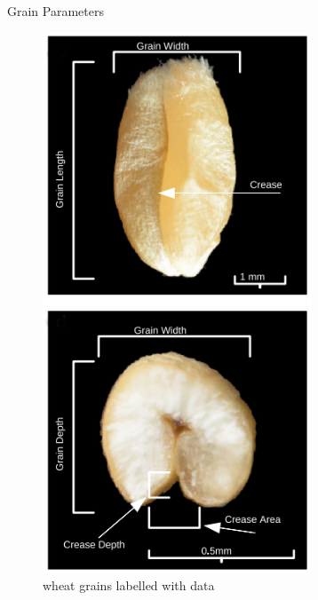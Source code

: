 \documentclass[final]{beamer}
\begin{document}
\begin{frame}{}
\begin{textblock}{27.7}
\begin{block}{Grain Parameters}
\begin{multicols}{2}
        \begin{figure}[htb]
          \centering
          \includegraphics[width=8cm]{collection2.png}
          \caption{\label{fig:real} wheat grains labelled with data}
        \end{figure}

        \columnbreak


\end{multicols}
\end{block}
\end{textblock}
\end{frame}
\end{document}
